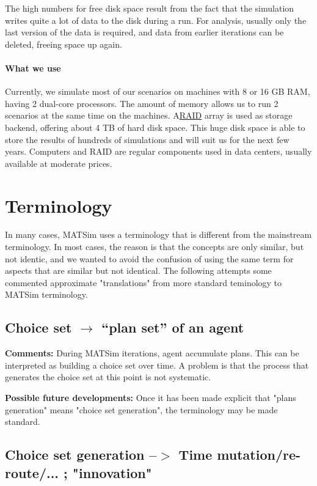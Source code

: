 \documentclass[a4paper,11pt]{report}
\begin{document}
The  high numbers for free disk space result from the fact that the  simulation writes quite a lot of data to the disk during a run. For  analysis, usually only the last version of the data is required, and  data from earlier iterations can be deleted, freeing space up again.

\subsubsection{What we use}

Currently,  we simulate most of our scenarios on machines with 8 or 16 GB RAM,  having 2 dual-core processors. The amount of memory allows us to run 2  scenarios at the same time on the machines. A\href{http://en.wikipedia.org/wiki/RAID}{RAID}  array is used as storage backend, offering about 4 TB of hard disk  space. This huge disk space is able to store the results of hundreds of  simulations and will suit us for the next few years. Computers and RAID  are regular components used in data centers, usually available at  moderate prices.

\chapter{Terminology}

In  many cases, MATSim uses a terminology that is different from the  mainstream terminology. In most cases, the reason is that the  concepts are only similar, but not identic, and we wanted to avoid the  confusion of using the same term for aspects that are similar but not  identical. The following attempts some commented approximate  "translations" from more standard teminology to MATSim terminology.

\vfill\eject
\section{Choice set $\to$ ``plan set'' of an agent}

\textbf{Comments:} During MATSim iterations, agent accumulate   plans. This can be  interpreted as building a choice set over  time. A  problem is that the  process that generates the choice  set at this  point is not systematic.

\textbf{Possible future developments:} Once it has been made explicit that "plans generation" means "choice set generation", the terminology may be made standard.

\vfill\eject
\section{Choice set generation --$>$ Time mutation/re-route/... ; "innovation"}
\end{document}
